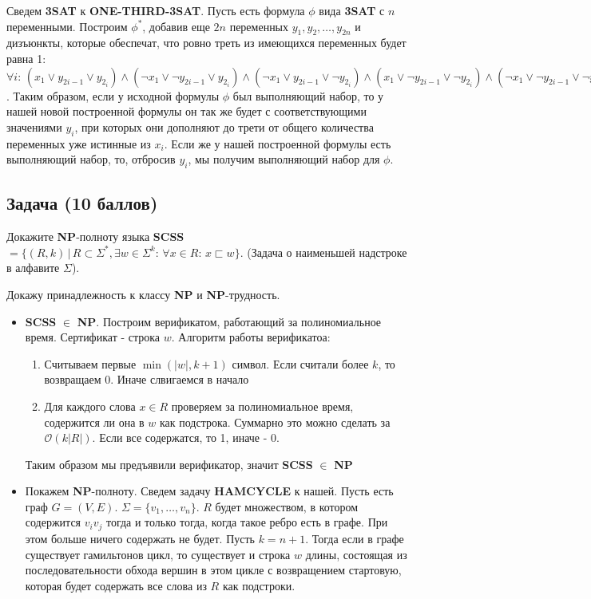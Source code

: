 \begin{solution}
    Сведем \textbf{3SAT} к \textbf{ONE-THIRD-3SAT}. Пусть есть формула $\phi$ вида \textbf{3SAT} с $n$ переменными. Построим $\phi^*$, добавив еще $2n$ переменных  $y_1, y_2, \dots, y_{2n}$ и дизъюнкты, которые обеспечат, что ровно треть из имеющихся переменных будет равна 1: $\forall i: \, (x_1 \vee y_{2i - 1} \vee y_{2_i}) \wedge (\neg x_1 \vee \neg y_{2i - 1} \vee y_{2_i}) \wedge (\neg x_1 \vee y_{2i - 1} \vee \neg y_{2_i}) \wedge (x_1 \vee \neg y_{2i - 1} \vee \neg y_{2_i}) \wedge (\neg x_1 \vee \neg y_{2i - 1} \vee \neg y_{2_i})$. Таким образом, если у исходной формулы $\phi$ был выполняющий набор, то у нашей новой построенной формулы он так же будет с соответствующими значениями $y_i$, при которых они дополняют до трети от общего количества переменных уже истинные из $x_i$. Если же у нашей построенной формулы есть выполняющий набор, то, отбросив $y_i$, мы получим выполняющий набор для $\phi$.
\end{solution}


\subsection{Задача \textbf{(10 баллов)}}

Докажите \textbf{NP}-полноту языка \textbf{SCSS} $= \{(R, k) \, | \, R \subset \Sigma^*, \exists w \in \Sigma^k: \, \forall x \in R: \, x \sqsubset w\}$. (Задача о наименьшей надстроке в алфавите $\Sigma$).

\begin{solution}
    Докажу принадлежность к классу \textbf{NP} и \textbf{NP}-трудность.
    \begin{itemize}
        \item \textbf{SCSS} $\in$ \textbf{NP}. Построим верификатом, работающий за полиномиальное время. Сертификат - строка $w$. Алгоритм работы верификатоа:
              \begin{enumerate}
                  \item Считываем первые $\min(|w|, k + 1)$ символ. Если считали более $k$, то возвращаем 0. Иначе слвигаемся в начало
                  \item Для каждого слова $x \in R$ проверяем за полиномиальное время, содержится ли она в $w$ как подстрока. Суммарно это можно сделать за $\mathcal{O}(k|R|)$. Если все содержатся, то 1, иначе - 0.
              \end{enumerate}
              Таким образом мы предъявили верификатор, значит \textbf{SCSS} $\in$ \textbf{NP}
        \item Покажем \textbf{NP}-полноту. Сведем задачу \textbf{HAMCYCLE} к нашей. Пусть есть граф $G = (V, E)$. $\Sigma = \{v_1, \dots, v_n\}$. $R$ будет множеством, в котором содержится $v_iv_j$ тогда и только тогда, когда такое ребро есть в графе. При этом больше ничего содержать не будет. Пусть $k = n+1$. Тогда если в графе существует гамильтонов цикл, то существует и строка $w$ длины, состоящая из последовательности обхода вершин в этом цикле с возвращением стартовую, которая будет содержать все слова из $R$ как подстроки.
    \end{itemize}
\end{solution}


